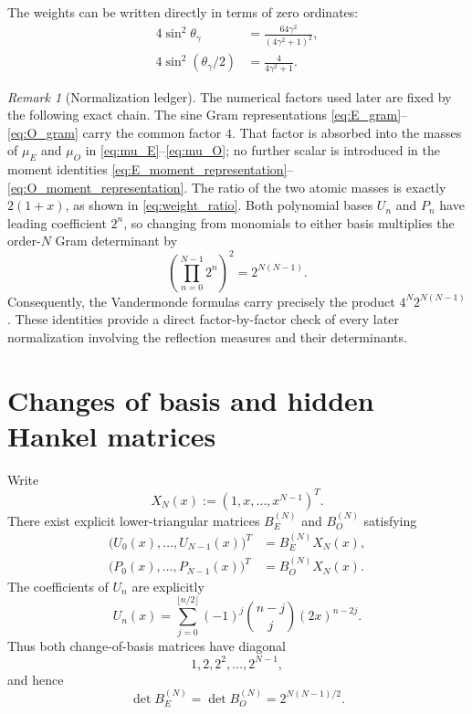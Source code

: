 \documentclass[preprint,12pt]{elsarticle}
\numberwithin{equation}{section}
\theoremstyle{plain}
\theoremstyle{definition}
\theoremstyle{remark}
\newtheorem{remark}[theorem]{Remark}
\begin{document}
The weights can be written directly in terms of zero ordinates:
\begin{align}
4\sin^2\theta_\gamma
&=\frac{64\gamma^2}{(4\gamma^2+1)^2},
\label{eq:E_weight_gamma}\\
4\sin^2(\theta_\gamma/2)
&=\frac{4}{4\gamma^2+1}.
\label{eq:O_weight_gamma}
\end{align}

\begin{remark}[Normalization ledger]
\label{rem:normalization_ledger}
The numerical factors used later are fixed by the following exact chain.  The sine Gram
representations \eqref{eq:E_gram}--\eqref{eq:O_gram} carry the common factor \(4\).
That factor is absorbed into the masses of \(\mu_E\) and \(\mu_O\) in
\eqref{eq:mu_E}--\eqref{eq:mu_O}; no further scalar is introduced in the moment identities
\eqref{eq:E_moment_representation}--\eqref{eq:O_moment_representation}.  The ratio of the two
atomic masses is exactly \(2(1+x)\), as shown in \eqref{eq:weight_ratio}.  Both polynomial bases
\(U_n\) and \(P_n\) have leading coefficient \(2^n\), so changing from monomials to either basis
multiplies the order-\(N\) Gram determinant by
\[
\left(\prod_{n=0}^{N-1}2^n\right)^2=2^{N(N-1)}.
\]
Consequently, the Vandermonde formulas carry precisely the product
\(4^N2^{N(N-1)}\).  These identities provide a direct factor-by-factor check of every later
normalization involving the reflection measures and their determinants.
\end{remark}

\section{Changes of basis and hidden Hankel matrices}
\label{sec:changes_of_basis}

Write
\begin{equation}
X_N(x):=(1,x,\dots,x^{N-1})^T.
\label{eq:monomial_vector}
\end{equation}
There exist explicit lower-triangular matrices $B_E^{(N)}$ and $B_O^{(N)}$ satisfying
\begin{align}
\bigl(U_0(x),\dots,U_{N-1}(x)\bigr)^T
&=B_E^{(N)}X_N(x),
\label{eq:CE_basis_change}\\
\bigl(P_0(x),\dots,P_{N-1}(x)\bigr)^T
&=B_O^{(N)}X_N(x).
\label{eq:CO_basis_change}
\end{align}
The coefficients of $U_n$ are explicitly
\begin{equation}
U_n(x)=
\sum_{j=0}^{\lfloor n/2\rfloor}
(-1)^j\binom{n-j}{j}(2x)^{n-2j}.
\label{eq:U_explicit_coefficients}
\end{equation}
Thus both change-of-basis matrices have diagonal
\begin{equation}
1,2,2^2,\dots,2^{N-1},
\label{eq:C_diagonal}
\end{equation}
and hence
\begin{equation}
\det B_E^{(N)}=\det B_O^{(N)}=2^{N(N-1)/2}.
\label{eq:C_determinants}
\end{equation}
\end{document}
